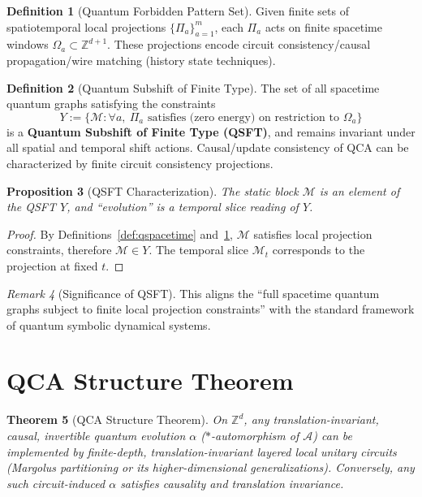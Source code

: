 \documentclass[11pt]{article}
\newtheorem{theorem}{Theorem}[section]
\newtheorem{proposition}[theorem]{Proposition}
\theoremstyle{definition}
\newtheorem{definition}[theorem]{Definition}
\theoremstyle{remark}
\newtheorem{remark}[theorem]{Remark}
\begin{document}
\begin{definition}[Quantum Forbidden Pattern Set]\label{def:qforbidden}
Given finite sets of spatiotemporal local projections \( \{\Pi_a\}_{a=1}^m \), each \( \Pi_a \) acts on finite spacetime windows \( \Omega_a \subset \mathbb{Z}^{d+1} \). These projections encode circuit consistency/causal propagation/wire matching (history state techniques).
\end{definition}

\begin{definition}[Quantum Subshift of Finite Type]\label{def:qsft}
The set of all spacetime quantum graphs satisfying the constraints
\[
Y := \{ \mathcal{M} : \forall a, \ \Pi_a \text{ satisfies (zero energy) on restriction to } \Omega_a \}
\]
is a \textbf{Quantum Subshift of Finite Type (QSFT)}, and remains invariant under all spatial and temporal shift actions. Causal/update consistency of QCA can be characterized by finite circuit consistency projections.
\end{definition}

\begin{proposition}[QSFT Characterization]\label{prop:qsft}
The static block \( \mathcal{M} \) is an element of the QSFT \( Y \), and ``evolution'' is a temporal slice reading of \( Y \).
\end{proposition}

\begin{proof}
By Definitions~\ref{def:qspacetime} and~\ref{def:qforbidden}, \( \mathcal{M} \) satisfies local projection constraints, therefore \( \mathcal{M} \in Y \). The temporal slice \( \mathcal{M}_t \) corresponds to the projection at fixed \( t \).
\end{proof}

\begin{remark}[Significance of QSFT]
This aligns the ``full spacetime quantum graphs subject to finite local projection constraints'' with the standard framework of quantum symbolic dynamical systems.
\end{remark}

\section{QCA Structure Theorem}\label{sec:structure}

\begin{theorem}[QCA Structure Theorem]\label{thm:structure}
On \( \mathbb{Z}^d \), any translation-invariant, causal, invertible quantum evolution \( \alpha \) (\( * \)-automorphism of \( \mathcal{A} \)) can be implemented by finite-depth, translation-invariant layered local unitary circuits (Margolus partitioning or its higher-dimensional generalizations). Conversely, any such circuit-induced \( \alpha \) satisfies causality and translation invariance.
\end{theorem}
\end{document}

